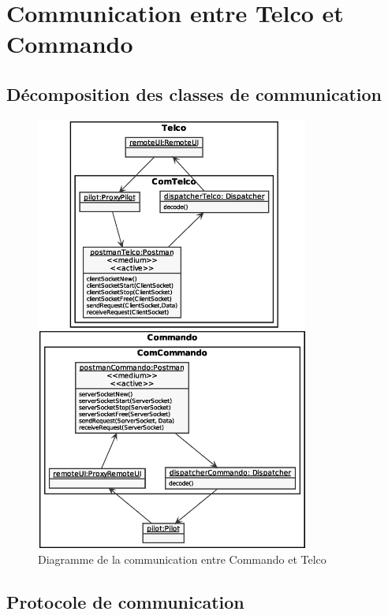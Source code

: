 \section{Communication entre Telco et Commando}

\subsection{Décomposition des classes de communication}
\begin{figure}[H] 
    \centering
    \includegraphics[width=0.8\textwidth]{img/diagrammeCommunication.eps}
    \caption{Diagramme de la communication entre Commando et Telco}
\end{figure}

\subsection{Protocole de communication}